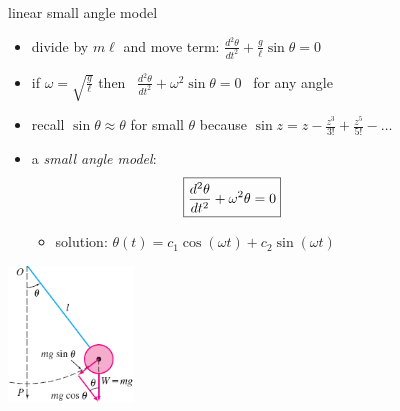 \documentclass[urlcolor=blue,dvipsnames]{beamer}
\begin{document}
\begin{frame}{linear small angle model}

\begin{itemize}
\item divide by $m\ell$ and move term: \quad $\displaystyle \frac{d^2\theta}{dt^2} + \frac{g}{\ell} \sin\theta = 0$
\item if $\displaystyle \omega = \sqrt{\frac{g}{\ell}}$ then \, $\displaystyle \boxed{\frac{d^2\theta}{dt^2} + \omega^2 \sin\theta = 0}$ \, for any angle
\item recall $\sin\theta \approx \theta$ for small $\theta$ because $\sin z = z - \frac{z^3}{3!} + \frac{z^5}{5!} - \dots$
\item a \emph{small angle model}:
    $$\boxed{\frac{d^2\theta}{dt^2} + \omega^2 \theta = 0} \hspace{20mm}$$
    \begin{itemize}
    \item solution: $\theta(t) = c_1 \cos(\omega t) + c_2 \sin(\omega t)$
    \end{itemize}
\end{itemize}

\vspace{-30mm}
\hfill \includegraphics[width=0.25\textwidth]{figs/pendulum}

\end{frame}
\end{document}
